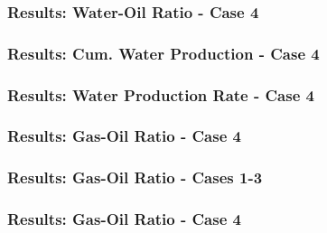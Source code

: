 

\begin{frame}
    \frametitle{Results: Water-Oil Ratio - Case 4}
    \centerline{}
\end{frame}


\begin{frame}
    \frametitle{Results: Cum. Water Production - Case 4}
    \centerline{}
\end{frame}


\begin{frame}
    \frametitle{Results: Water Production Rate - Case 4}
    \centerline{}
\end{frame}

\begin{frame}
    \frametitle{Results: Gas-Oil Ratio - Case 4}
    \centerline{}
\end{frame}

\begin{frame}
    \frametitle{Results: Gas-Oil Ratio - Cases 1-3}
    \centerline{}
\end{frame}

\begin{frame}
    \frametitle{Results: Gas-Oil Ratio - Case 4}
    \centerline{}
\end{frame}

